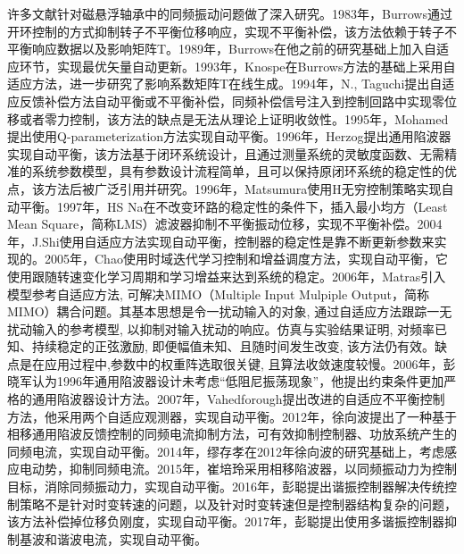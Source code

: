 \documentclass[
  lang=cn,
  degree=master,
  openany,oneside
]{nuaathesis}
\begin{document}
许多文献针对磁悬浮轴承中的同频振动问题做了深入研究。1983年，Burrows通过开环控制的方式抑制转子不平衡位移响应，实现不平衡补偿，该方法依赖于转子不平衡响应数据以及影响矩阵T\cite{burrows1983vibration}。1989年，Burrows在他之前的研究基础上加入自适应环节，实现最优矢量自动更新\cite{burrows1989active}。1993年，Knospe在Burrows方法的基础上采用自适应方法，进一步研究了影响系数矩阵T在线生成\cite{knospe1993adaptive}。1994年，N., Taguchi提出自适应反馈补偿方法自动平衡或不平衡补偿，同频补偿信号注入到控制回路中实现零位移或者零力控制，该方法的缺点是无法从理论上证明收敛性\cite{taguchi1994unbalance}。1995年，Mohamed提出使用Q-parameterization方法实现自动平衡\cite{mohamed1995imbalance}。1996年，Herzog提出通用陷波器实现自动平衡，该方法基于闭环系统设计，且通过测量系统的灵敏度函数、无需精准的系统参数模型，具有参数设计流程简单，且可以保持原闭环系统的稳定性的优点，该方法后被广泛引用并研究\cite{herzog1996unbalance}。1996年，Matsumura使用H无穷控制策略实现自动平衡\cite{matsumura1996application}。1997年，HS Na在不改变环路的稳定性的条件下，插入最小均方（Least Mean Square，简称LMS）滤波器抑制不平衡振动位移，实现不平衡补偿\cite{na1997adaptive}。2004年，J.Shi使用自适应方法实现自动平衡，控制器的稳定性是靠不断更新参数来实现的\cite{shi2004synchronous}。2005年，Chao使用时域迭代学习控制和增益调度方法，实现自动平衡，它使用跟随转速变化学习周期和学习增益来达到系统的稳定\cite{bi2005automatic}。2006年，Matras引入模型参考自适应方法, 可解决MIMO（Multiple Input Mulpiple Output，简称MIMO）耦合问题。其基本思想是令一扰动输入的对象, 通过自适应方法跟踪一无扰动输入的参考模型, 以抑制对输入扰动的响应。仿真与实验结果证明, 对频率已知、持续稳定的正弦激励, 即便幅值未知、且随时间发生改变, 该方法仍有效。缺点是在应用过程中,参数中的权重阵选取很关键, 且算法收敛速度较慢\cite{matras2006suppression}。2006年，彭晓军认为1996年通用陷波器设计未考虑“低阻尼振荡现象”，他提出约束条件更加严格的通用陷波器设计方法\cite{彭晓军2006磁电轴承中抑制不平衡振动的陷波滤波器设计方法}。2007年，Vahedforough提出改进的自适应不平衡控制方法，他采用两个自适应观测器，实现自动平衡\cite{vahedforough2007estimation}。2012年，徐向波提出了一种基于相移通用陷波反馈控制的同频电流抑制方法，可有效抑制控制器、功放系统产生的同频电流，实现自动平衡\cite{xu2012stability}。2014年，缪存孝在2012年徐向波的研究基础上，考虑感应电动势，抑制同频电流\cite{缪存孝2014含转子不平衡的磁轴承建模与同频电流抑制}。2015年，崔培玲采用相移陷波器，以同频振动力为控制目标，消除同频振动力，实现自动平衡\cite{崔培玲2015基于相移陷波器的磁轴承不平衡振动全频自适应控制}。2016年，彭聪提出谐振控制器解决传统控制策略不是针对时变转速的问题，以及针对时变转速但是控制器结构复杂的问题，该方法补偿掉位移负刚度，实现自动平衡\cite{peng2016synchronous}。2017年，彭聪提出使用多谐振控制器抑制基波和谐波电流，实现自动平衡\cite{peng2016frequency}。
\end{document}
